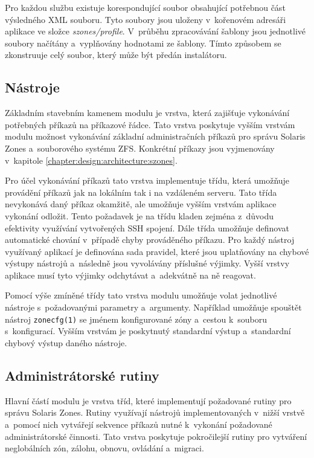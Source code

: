 Pro každou službu existuje korespondující soubor obsahující potřebnou část výsledného XML souboru. Tyto soubory jsou
uloženy v~kořenovém adresáři aplikace ve složce \textit{szones/profile}. V~průběhu zpracovávání šablony jsou jednotlivé soubory
načítány a~vyplňovány hodnotami ze šablony. Tímto způsobem se zkonstruuje celý soubor, který může být předán instalátoru.
\subsection{Nástroje}
\label{chapter:implementation:szones:commands}
Základním stavebním kamenem modulu je vrstva, která zajišťuje vykonávání potřebných příkazů na příkazové řádce.
Tato vrstva poskytuje vyšším vrstvám modulu možnost vykonávání základní administračních příkazů pro správu Solaris Zones
a~souborového systému ZFS. Konkrétní příkazy jsou vyjmenovány v~kapitole \ref{chapter:design:architecture:szones}.

Pro účel vykonávání příkazů tato vrstva implementuje třídu, která umožňuje provádění příkazů jak na lokálním tak i
na vzdáleném serveru. Tato třída nevykonává daný příkaz okamžitě, ale umožňuje vyšším vrstvám aplikace vykonání odložit.
Tento požadavek je na třídu kladen zejména z~důvodu efektivity využívání vytvořených SSH spojení. Dále třída umožňuje
definovat automatické chování v~případě chyby prováděného příkazu. Pro každý nástroj využívaný aplikací je definována sada
pravidel, které jsou uplatňovány na chybové výstupy nástrojů a~následně jsou vyvolávány příslušné výjimky. Vyšší vrstvy
aplikace musí tyto výjimky odchytávat a~adekvátně na ně reagovat.

Pomocí výše zmíněné třídy tato vrstva modulu umožňuje volat jednotlivé nástroje s~požadovanými parametry a~argumenty.
Například umožňuje spouštět nástroj \verb|zonecfg(1)| se jménem konfigurované zóny a~cestou k~souboru s~konfigurací. Vyšším
vrstvám je poskytnutý standardní výstup a~standardní chybový výstup daného nástroje.
\subsection{Administrátorské rutiny}
\label{chapter:implementation:szones:routines}
Hlavní částí modulu je vrstva tříd, které implementují požadované rutiny pro správu Solaris Zones. Rutiny využívají
nástrojů implementovaných v~nižší vrstvě a~pomocí nich vytvářejí sekvence příkazů nutné k~vykonání požadované administrátorské činnosti.
Tato vrstva poskytuje pokročilejší rutiny pro vytváření neglobálních zón, zálohu, obnovu, ovládání a~migraci.
